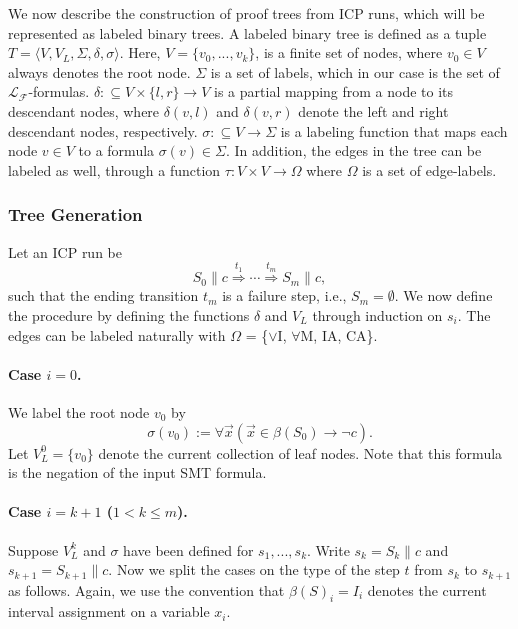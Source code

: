 \documentclass[12pt]{article}
\begin{document}
We now describe the construction of proof trees from ICP runs, which will be
represented as labeled binary trees. A labeled binary tree is defined as a
tuple $T =
\langle V, V_L,  \Sigma, \delta, \sigma\rangle$. Here, $V = \{v_0, ..., v_k\}$, is a finite set of nodes, where $v_0\in V$ always denotes the
root
node. $\Sigma$ is a set of labels, which in our case is the set of
$\mathcal{L}_\mathcal{F}$-formulas. $\delta:\subseteq V\times \{l,r\}
\rightarrow V$ is a
partial mapping from a node to its descendant nodes, where $\delta(v, l)$ and
$\delta(v, r)$ denote the left and right descendant nodes, respectively.
$\sigma:\subseteq V\rightarrow \Sigma$ is a labeling function that maps each node
$v\in V$ to a formula $\sigma(v) \in \Sigma$. In addition, the edges in the
tree can be labeled as well, through a function $\tau: V\times V\rightarrow \Omega$
where $\Omega$ is a set of edge-labels.

\subsubsection{Tree Generation} Let an ICP run be
$$S_0\parallel c\stackrel{t_1}{\Longrightarrow}\cdots
\stackrel{t_m}{\Longrightarrow} S_m\parallel c,$$
such that the ending transition $t_m$ is a failure step, i.e., $S_m=\emptyset$.
We now define the procedure by defining the functions $\delta$ and
$V_L$ through induction on $s_i$. The edges can be labeled naturally with
$\Omega$ = \{{$\vee$I}, $\forall$M, IA, CA\}.

\paragraph{Case $i= 0$.} We label the root node $v_0$ by
$$\sigma(v_0) := \forall \vec x( \vec x\in \beta(S_0) \rightarrow \neg c).$$
Let $V_L^0= \{v_0\}$ denote the current
collection of leaf nodes. Note that this formula is the negation of the input
SMT formula.




\paragraph{Case $i = k+1$ ($1< k \leq m$). }
Suppose $V_L^k$ and $\sigma$ have been defined for $s_1, ...,s_k$. Write
$s_k = S_k
\parallel c$ and $s_{k+1} = S_{k+1} \parallel c$. Now we split
the cases on the type of the step $t$ from $s_k$ to $s_{k+1}$ as follows.
Again, we use the convention that $\beta(S)_i = I_i$ denotes the current
interval assignment on a variable $x_i$.
\end{document}
